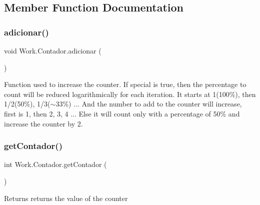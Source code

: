 \subsection{Member Function Documentation}
\mbox{\label{classWork_1_1Contador_aef3e8c3204ac3653b6397a4df4aae8b3}} 
\subsubsection{\texorpdfstring{adicionar()}{adicionar()}}
{\footnotesize\ttfamily void Work.\+Contador.\+adicionar (\begin{DoxyParamCaption}{ }\end{DoxyParamCaption})\hspace{0.3cm}{\ttfamily [inline]}}

Function used to increase the counter. If special is true, then the percentage to count will be reduced logarithmically for each iteration. It starts at 1(100\%), then 1/2(50\%), 1/3($\sim$33\%) ... And the number to add to the counter will increase, first is 1, then 2, 3, 4 ... Else it will count only with a percentage of 50\% and increase the counter by 2. \mbox{\label{classWork_1_1Contador_ac0ffd5556a2919cb521fcc934e0b4627}} 
\subsubsection{\texorpdfstring{get\+Contador()}{getContador()}}
{\footnotesize\ttfamily int Work.\+Contador.\+get\+Contador (\begin{DoxyParamCaption}{ }\end{DoxyParamCaption})\hspace{0.3cm}{\ttfamily [inline]}}

\begin{DoxyReturn}{Returns}
returns the value of the counter 
\end{DoxyReturn}
\mbox{\label{classWork_1_1Contador_a272543fc47de1795d20af9b20bdd710d}} 
